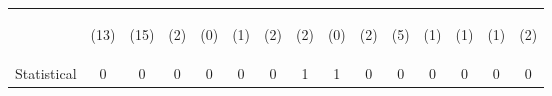 \begin{tabular}{lcccccccccccccc}
 & \begin{footnotesize}(13)\end{footnotesize} & \begin{footnotesize}(15)\end{footnotesize} & \begin{footnotesize}(2)\end{footnotesize} & \begin{footnotesize}(0)\end{footnotesize} & \begin{footnotesize}(1)\end{footnotesize} & \begin{footnotesize}(2)\end{footnotesize} & \begin{footnotesize}(2)\end{footnotesize} & \begin{footnotesize}(0)\end{footnotesize} & \begin{footnotesize}(2)\end{footnotesize} & \begin{footnotesize}(5)\end{footnotesize} & \begin{footnotesize}(1)\end{footnotesize} & \begin{footnotesize}(1)\end{footnotesize} & \begin{footnotesize}(1)\end{footnotesize} & \begin{footnotesize}(2)\end{footnotesize}\\
\noalign{\smallskip}Statistical & 0 & 0 & 0 & 0 & 0 & 0 & 1 & 1 & 0 & 0 & 0 & 0 & 0 & 0\\

\end{tabular}

